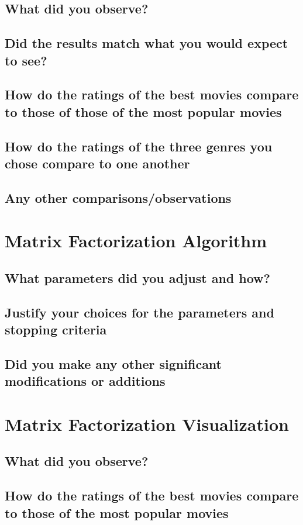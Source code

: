 \subsection{What did you observe?}
\subsection{Did the results match what you would expect to see?}
\subsection{How do the ratings of the best movies compare to those of those of the most popular movies}
\subsection{How do the ratings of the three genres you chose compare to one another}
\subsection{Any other comparisons/observations}

\section{Matrix Factorization Algorithm}
\medskip
\subsection{What parameters did you adjust and how?}
\subsection{Justify your choices for the parameters and stopping criteria}
\subsection{Did you make any other significant modifications or additions}

\section{Matrix Factorization Visualization}
\medskip
\subsection{What did you observe?}
\subsection{How do the ratings of the best movies compare to those of the most popular movies}
